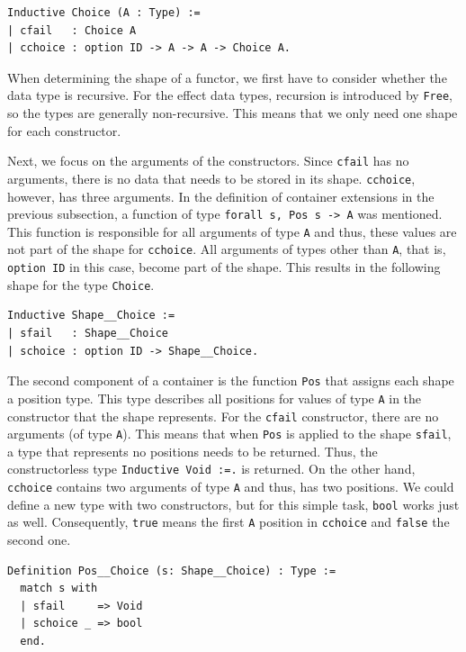 \documentclass[a4paper, 11pt, fleqn, twoside]{scrreprt}
\newcommand{\hinl}[1]{\texttt{#1}}
\newcommand{\cinl}[1]{\texttt{#1}}
\begin{document}
\begin{verbatim}
Inductive Choice (A : Type) :=
| cfail   : Choice A
| cchoice : option ID -> A -> A -> Choice A.
\end{verbatim}

When determining the shape of a functor, we first have to consider whether the data type is recursive.
For the effect data types, recursion is introduced by \cinl{Free}, so the types are generally non-recursive.
This means that we only need one shape for each constructor.

Next, we focus on the arguments of the constructors.
Since \cinl{cfail} has no arguments, there is no data that needs to be stored in its shape.
\cinl{cchoice}, however, has three arguments.
In the definition of container extensions in the previous subsection, a function of type \cinl{forall s, Pos s -> A} was mentioned.
This function is responsible for all arguments of type \cinl{A} and thus, these values are not part of the shape for \cinl{cchoice}.
All arguments of types other than \cinl{A}, that is, \cinl{option ID} in this case, become part of the shape.
This results in the following shape for the type \cinl{Choice}.

\begin{verbatim}
Inductive Shape__Choice :=
| sfail   : Shape__Choice
| schoice : option ID -> Shape__Choice.
\end{verbatim}

The second component of a container is the function \cinl{Pos} that assigns each shape a position type.
This type describes all positions for values of type \cinl{A} in the constructor that the shape represents.
For the \cinl{cfail} constructor, there are no arguments (of type \cinl{A}).
This means that when \cinl{Pos} is applied to the shape \cinl{sfail}, a type that represents no positions needs to be returned.
Thus, the constructorless type \cinl{Inductive Void :=.} is returned.
On the other hand, \hinl{cchoice} contains two arguments of type \cinl{A} and thus, has two positions.
We could define a new type with two constructors, but for this simple task, \cinl{bool} works just as well.
Consequently, \cinl{true} means the first \cinl{A} position in \cinl{cchoice} and \cinl{false} the second one.

\begin{verbatim}
Definition Pos__Choice (s: Shape__Choice) : Type :=
  match s with
  | sfail     => Void
  | schoice _ => bool
  end.
\end{verbatim}
\end{document}
